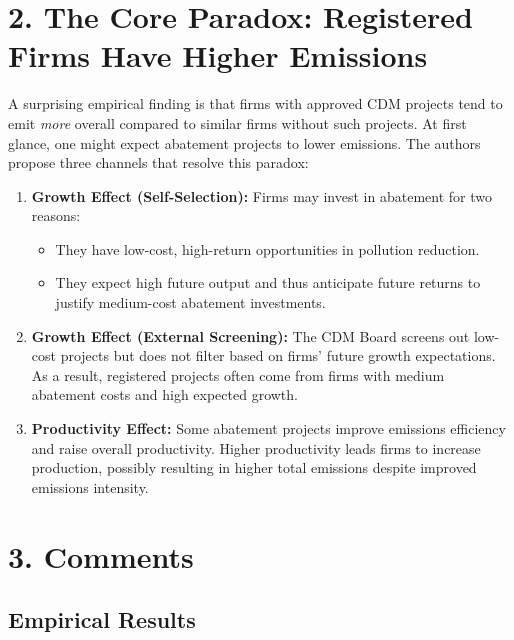 \documentclass[12pt]{article}[margin=1in]
\begin{document}
\section*{2. The Core Paradox: Registered Firms Have Higher Emissions}

A surprising empirical finding is that firms with approved CDM projects tend to emit \textit{more} overall compared to similar firms without such projects. At first glance, one might expect abatement projects to lower emissions. The authors propose three channels that resolve this paradox:

\begin{enumerate}
    \item \textbf{Growth Effect (Self-Selection):} Firms may invest in abatement for two reasons:
          \begin{itemize}
              \item They have low-cost, high-return opportunities in pollution reduction.
              \item They expect high future output and thus anticipate future returns to justify medium-cost abatement investments.
          \end{itemize}

    \item \textbf{Growth Effect (External Screening):} The CDM Board screens out low-cost projects but does not filter based on firms’ future growth expectations. As a result, registered projects often come from firms with medium abatement costs and high expected growth.

    \item \textbf{Productivity Effect:} Some abatement projects improve emissions efficiency and raise overall productivity. Higher productivity leads firms to increase production, possibly resulting in higher total emissions despite improved emissions intensity.
\end{enumerate}

\section*{3. Comments}

\subsection*{Empirical Results}
\end{document}
